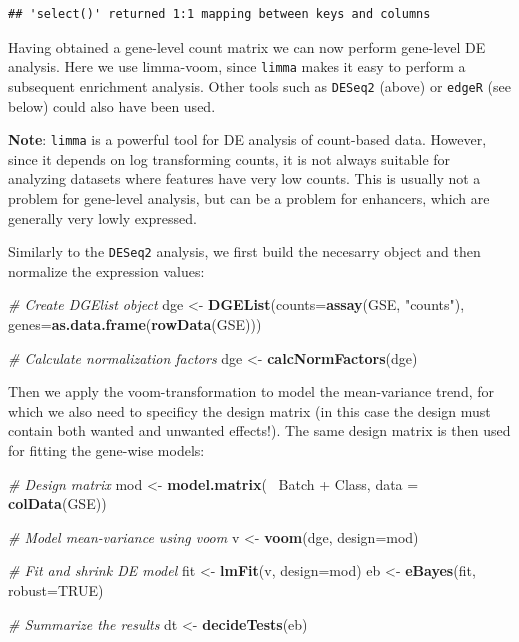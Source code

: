 \documentclass[9pt,a4paper,]{extarticle}
\newenvironment{Shaded}{\begin{snugshade}}{\end{snugshade}}
\newcommand{\KeywordTok}[1]{\textcolor[rgb]{0.13,0.29,0.53}{\textbf{{#1}}}}
\newcommand{\DataTypeTok}[1]{\textcolor[rgb]{0.13,0.29,0.53}{{#1}}}
\newcommand{\StringTok}[1]{\textcolor[rgb]{0.31,0.60,0.02}{{#1}}}
\newcommand{\CommentTok}[1]{\textcolor[rgb]{0.56,0.35,0.01}{\textit{{#1}}}}
\newcommand{\OtherTok}[1]{\textcolor[rgb]{0.56,0.35,0.01}{{#1}}}
\newcommand{\NormalTok}[1]{{#1}}
\begin{document}
\begin{verbatim}
## 'select()' returned 1:1 mapping between keys and columns
\end{verbatim}

Having obtained a gene-level count matrix we can now perform gene-level DE analysis. Here we use limma-voom, since \texttt{limma} makes it easy to perform a subsequent enrichment analysis. Other tools such as \texttt{DESeq2} (above) or \texttt{edgeR} (see below) could also have been used.

\textbf{Note}: \texttt{limma} is a powerful tool for DE analysis of count-based data. However, since it depends on log transforming counts, it is not always suitable for analyzing datasets where features have very low counts. This is usually not a problem for gene-level analysis, but can be a problem for enhancers, which are generally very lowly expressed.

Similarly to the \texttt{DESeq2} analysis, we first build the necesarry object and then normalize the expression values:

\begin{Shaded}
\begin{Highlighting}[]
\CommentTok{# Create DGElist object}
\NormalTok{dge <-}\StringTok{ }\KeywordTok{DGEList}\NormalTok{(}\DataTypeTok{counts=}\KeywordTok{assay}\NormalTok{(GSE, }\StringTok{"counts"}\NormalTok{),}
               \DataTypeTok{genes=}\KeywordTok{as.data.frame}\NormalTok{(}\KeywordTok{rowData}\NormalTok{(GSE)))}

\CommentTok{# Calculate normalization factors}
\NormalTok{dge <-}\StringTok{ }\KeywordTok{calcNormFactors}\NormalTok{(dge)}
\end{Highlighting}
\end{Shaded}

Then we apply the voom-transformation to model the mean-variance trend, for which we also need to specificy the design matrix (in this case the design must contain both wanted and unwanted effects!). The same design matrix is then used for fitting the gene-wise models:

\begin{Shaded}
\begin{Highlighting}[]
\CommentTok{# Design matrix}
\NormalTok{mod <-}\StringTok{ }\KeywordTok{model.matrix}\NormalTok{(~}\StringTok{ }\NormalTok{Batch +}\StringTok{ }\NormalTok{Class, }\DataTypeTok{data =} \KeywordTok{colData}\NormalTok{(GSE))}

\CommentTok{# Model mean-variance using voom}
\NormalTok{v <-}\StringTok{ }\KeywordTok{voom}\NormalTok{(dge, }\DataTypeTok{design=}\NormalTok{mod)}

\CommentTok{# Fit and shrink DE model}
\NormalTok{fit <-}\StringTok{ }\KeywordTok{lmFit}\NormalTok{(v, }\DataTypeTok{design=}\NormalTok{mod)}
\NormalTok{eb <-}\StringTok{ }\KeywordTok{eBayes}\NormalTok{(fit, }\DataTypeTok{robust=}\OtherTok{TRUE}\NormalTok{)}

\CommentTok{# Summarize the results}
\NormalTok{dt <-}\StringTok{ }\KeywordTok{decideTests}\NormalTok{(eb)}
\end{Highlighting}
\end{Shaded}
\end{document}
